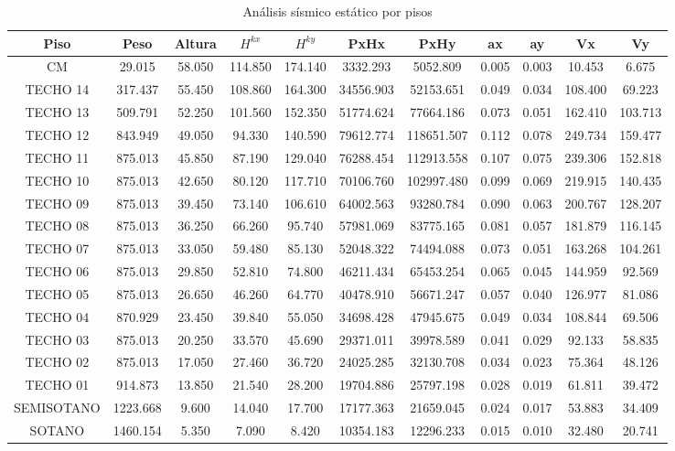 \documentclass{article}%
\begin{document}
%


\begin{table}[H]%
\centering%
\caption{Análisis sísmico estático por pisos}%
\begin{tabular}{ccccccccccc}
\toprule
Piso & Peso & Altura & $H^{kx}$ & $H^{ky}$ & PxHx & PxHy & ax & ay & Vx & Vy \\
\midrule
CM & 29.015 & 58.050 & 114.850 & 174.140 & 3332.293 & 5052.809 & 0.005 & 0.003 & 10.453 & 6.675 \\
TECHO 14 & 317.437 & 55.450 & 108.860 & 164.300 & 34556.903 & 52153.651 & 0.049 & 0.034 & 108.400 & 69.223 \\
TECHO 13 & 509.791 & 52.250 & 101.560 & 152.350 & 51774.624 & 77664.186 & 0.073 & 0.051 & 162.410 & 103.713 \\
TECHO 12 & 843.949 & 49.050 & 94.330 & 140.590 & 79612.774 & 118651.507 & 0.112 & 0.078 & 249.734 & 159.477 \\
TECHO 11 & 875.013 & 45.850 & 87.190 & 129.040 & 76288.454 & 112913.558 & 0.107 & 0.075 & 239.306 & 152.818 \\
TECHO 10 & 875.013 & 42.650 & 80.120 & 117.710 & 70106.760 & 102997.480 & 0.099 & 0.069 & 219.915 & 140.435 \\
TECHO 09 & 875.013 & 39.450 & 73.140 & 106.610 & 64002.563 & 93280.784 & 0.090 & 0.063 & 200.767 & 128.207 \\
TECHO 08 & 875.013 & 36.250 & 66.260 & 95.740 & 57981.069 & 83775.165 & 0.081 & 0.057 & 181.879 & 116.145 \\
TECHO 07 & 875.013 & 33.050 & 59.480 & 85.130 & 52048.322 & 74494.088 & 0.073 & 0.051 & 163.268 & 104.261 \\
TECHO 06 & 875.013 & 29.850 & 52.810 & 74.800 & 46211.434 & 65453.254 & 0.065 & 0.045 & 144.959 & 92.569 \\
TECHO 05 & 875.013 & 26.650 & 46.260 & 64.770 & 40478.910 & 56671.247 & 0.057 & 0.040 & 126.977 & 81.086 \\
TECHO 04 & 870.929 & 23.450 & 39.840 & 55.050 & 34698.428 & 47945.675 & 0.049 & 0.034 & 108.844 & 69.506 \\
TECHO 03 & 875.013 & 20.250 & 33.570 & 45.690 & 29371.011 & 39978.589 & 0.041 & 0.029 & 92.133 & 58.835 \\
TECHO 02 & 875.013 & 17.050 & 27.460 & 36.720 & 24025.285 & 32130.708 & 0.034 & 0.023 & 75.364 & 48.126 \\
TECHO 01 & 914.873 & 13.850 & 21.540 & 28.200 & 19704.886 & 25797.198 & 0.028 & 0.019 & 61.811 & 39.472 \\
SEMISOTANO & 1223.668 & 9.600 & 14.040 & 17.700 & 17177.363 & 21659.045 & 0.024 & 0.017 & 53.883 & 34.409 \\
SOTANO & 1460.154 & 5.350 & 7.090 & 8.420 & 10354.183 & 12296.233 & 0.015 & 0.010 & 32.480 & 20.741 \\
\bottomrule
\end{tabular}
%
\end{table}
\end{document}
